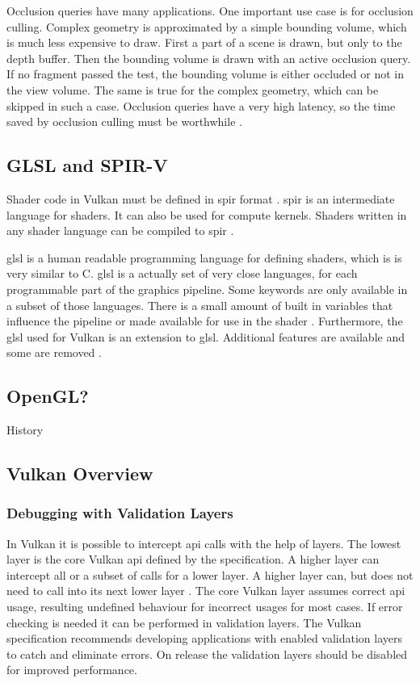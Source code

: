 Occlusion queries have many applications. One important use case is for occlusion culling. Complex geometry is approximated by a simple bounding volume, which is much less expensive to draw. First a part of a scene is drawn, but only to the depth buffer. Then the bounding volume is drawn with an active occlusion query. If no fragment passed the test, the bounding volume is either occluded or not in the view volume. The same is true for the complex geometry, which can be skipped in such a case. Occlusion queries have a very high latency, so the time saved by occlusion culling must be worthwhile \cite{akine:2018:realtime, sellers:vulkanprogramming}.


\subsection{GLSL and SPIR-V}

Shader code in Vulkan must be defined in \gls{spir} format \cite{khronos:vulkan:spec1.1}. \Gls{spir} is an intermediate language for shaders. It can also be used for compute kernels. Shaders written in any shader language can be compiled to \gls{spir} \cite{kessenich:2018:spir}.

\Gls{glsl} is a human readable programming language for defining shaders, which is is very similar to C. \Gls{glsl} is a actually set of very close languages, for each programmable part of the graphics pipeline. Some keywords are only available in a subset of those languages. There is a small amount of built in variables that influence the pipeline or made available for use in the shader \cite{khronos:glsl4.60:spec}. Furthermore, the \gls{glsl} used for Vulkan is an extension to \gls{glsl}. Additional features are available and some are removed \cite{khronos:vulkan:glsl}.

\subsection{OpenGL?}
History


\subsection{Vulkan Overview}


\subsubsection{Debugging with Validation Layers}

In Vulkan it is possible to intercept \gls{api} calls with the help of layers. The lowest layer is the core Vulkan \gls{api} defined by the specification. A higher layer can intercept all or a subset of calls for a lower layer. A higher layer can, but does not need to call into its next lower layer \cite{khronos:vulkan:spec1.1}.
The core Vulkan layer assumes correct \gls{api} usage, resulting undefined behaviour for incorrect usages for most cases. If error checking is needed it can be performed in validation layers. The Vulkan specification recommends developing applications with enabled validation layers to catch and eliminate errors. On release the validation layers should be disabled for improved performance.

